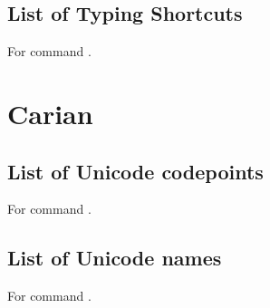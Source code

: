 \subsection{List of Typing Shortcuts}
For command \codedetok{\brtransts{}}.
\begin{multicols}{4}\noindent
\brtag
\brshowplainlistts
\eolist
\end{multicols}
%






\section{Carian}


\subsection{List of Unicode codepoints}
For command \codedetok{\catransuc{}}.
\begin{multicols}{4}\noindent
\catag
\cashowplainlistuc
\eolist
\end{multicols}

\subsection{List of Unicode names}
For command \codedetok{\catransun{}}.
\begin{multicols}{4}\noindent
\catag
\cashowplainlistun
\eolist
\end{multicols}

%




